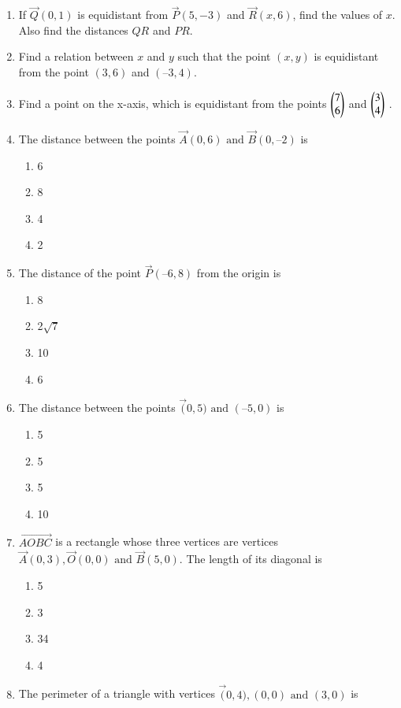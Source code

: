 \begin{enumerate}[label=\thesubsection.\arabic*, ref=\thesubsection.\theenumi]
\item  If $\vec{Q}(0,  1)$ is equidistant from $\vec{P}(5,  -3)$ and $\vec{R}(x,  6)$,  find the values of $x$. Also find the
distances $QR$ and $PR$.
\item  Find a relation between $x$ and $y$ such that the point $(x, y)$ is equidistant from the point
$(3,  6)$ and $(– 3,  4)$.
	\item Find a point on the x-axis, which is equidistant from the points $\begin{pmatrix}
  7 \\
  6 \\
 \end{pmatrix}$ and $\begin{pmatrix}
  3 \\
  4 \\
 \end{pmatrix}$
.
\label{chapters/11/10/1/4}
	\\
	\solution 

\item The distance between the points $\vec{A}(0,  6) \text{ and } \vec{B}(0,  –2)$ is
	\begin{enumerate}
\item 6
\item 8
\item 4	
\item 2
	\end{enumerate}
\item The distance of the point $\vec{P} (–6,  8)$ from the origin is
\begin{enumerate}

\item 8
\item 2$\sqrt{7}$ 
\item 10
\item 6
\end{enumerate}
\item The distance between the points $\vec(0,  5)\text{ and }(–5,  0)$ is
\begin{enumerate}

\item 5
\item 5
\item 5
\item 10
\end{enumerate}
\item $\vec{AOBC}$ is a rectangle whose three vertices are vertices $\vec{A} (0,  3),  \vec{O}(0,  0)\text{ and }
	\vec{B} (5,  0)$. The length of its diagonal is
\begin{enumerate}
\item 5
\item3
\item 34
\item 4
\end{enumerate}
\item The perimeter of a triangle with vertices $\vec(0,  4),  (0,  0) \text{ and } (3,  0)$ is
\begin{enumerate}


\end{enumerate}
\end{enumerate}
